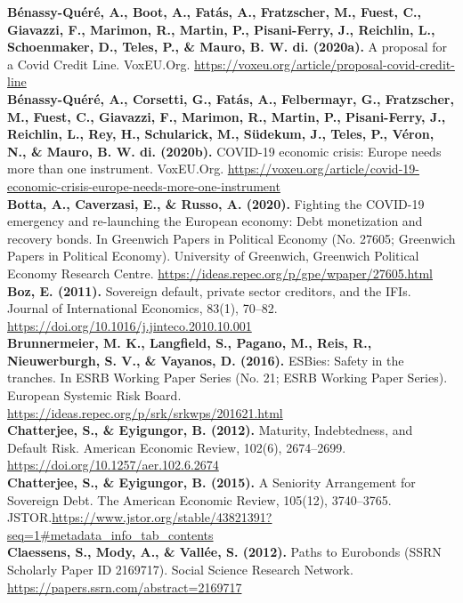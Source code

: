 \textbf{Bénassy-Quéré, A., Boot, A., Fatás, A., Fratzscher, M., Fuest, C., Giavazzi, F., Marimon, R., Martin, P., Pisani-Ferry, J., Reichlin, L., Schoenmaker, D., Teles, P., \& Mauro, B. W. di. (2020a).} A proposal for a Covid Credit Line. VoxEU.Org. \url{https://voxeu.org/article/proposal-covid-credit-line}\\
\clearpage
\textbf{Bénassy-Quéré, A., Corsetti, G., Fatás, A., Felbermayr, G., Fratzscher, M., Fuest, C., Giavazzi, F., Marimon, R., Martin, P., Pisani-Ferry, J., Reichlin, L., Rey, H., Schularick, M., Südekum, J., Teles, P., Véron, N., \& Mauro, B. W. di. (2020b).} COVID-19 economic crisis: Europe needs more than one instrument. VoxEU.Org. \url{https://voxeu.org/article/covid-19-economic-crisis-europe-needs-more-one-instrument}\\

\textbf{Botta, A., Caverzasi, E., \& Russo, A. (2020).} Fighting the COVID-19 emergency and re-launching the European economy: Debt monetization and recovery bonds. In Greenwich Papers in Political Economy (No. 27605; Greenwich Papers in Political Economy). University of Greenwich, Greenwich Political Economy Research Centre. \url{https://ideas.repec.org/p/gpe/wpaper/27605.html}\\

\textbf{Boz, E. (2011).} Sovereign default, private sector creditors, and the IFIs. Journal of International Economics, 83(1), 70–82. \url{https://doi.org/10.1016/j.jinteco.2010.10.001}\\

\textbf{Brunnermeier, M. K., Langfield, S., Pagano, M., Reis, R., Nieuwerburgh, S. V., \& Vayanos, D. (2016).} ESBies: Safety in the tranches. In ESRB Working Paper Series (No. 21; ESRB Working Paper Series). European Systemic Risk Board. \url{https://ideas.repec.org/p/srk/srkwps/201621.html}\\

\textbf{Chatterjee, S., \& Eyigungor, B. (2012).} Maturity, Indebtedness, and Default Risk. American Economic Review, 102(6), 2674–2699. \url{https://doi.org/10.1257/aer.102.6.2674}\\

\textbf{Chatterjee, S., \& Eyigungor, B. (2015).} A Seniority Arrangement for Sovereign Debt. The American Economic Review, 105(12), 3740–3765. JSTOR.\url{https://www.jstor.org/stable/43821391?seq=1#metadata_info_tab_contents}\\

\textbf{Claessens, S., Mody, A., \& Vallée, S. (2012).} Paths to Eurobonds (SSRN Scholarly Paper ID 2169717). Social Science Research Network. \url{https://papers.ssrn.com/abstract=2169717}\\

